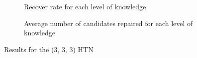 \documentclass[conference]{IEEEtran}
\begin{document}
	
	\begin{figure}[t]
		\centering
		\begin{subfigure}[b]{0.5 \columnwidth}            
			\caption{ Recover rate for each level of knowledge}
			\label{Fig:Data3}
		\end{subfigure}
		\hspace{1cm}
		\begin{subfigure}[b]{0.5 \columnwidth}
			\centering
			\caption{Average number of candidates repaired for each level of knowledge}
			\label{Fig:Data4}
		\end{subfigure}
		\caption{Results for the (3, 3, 3) HTN}\label{fig:TOF}
	\end{figure}
	
\end{document}

